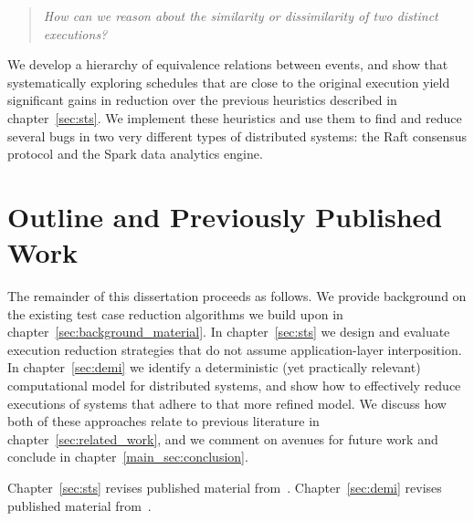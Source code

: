\begin{quote}
\textit{How can we reason about the similarity or dissimilarity of two distinct executions?}
\end{quote}

We develop a hierarchy of equivalence relations between events, and show
that systematically exploring schedules that are close to the original
execution yield significant gains in reduction over the previous
heuristics described in chapter~\ref{sec:sts}. We implement these heuristics
and use them to find and reduce several bugs in two very different types of distributed
systems: the Raft consensus protocol
and the Spark data analytics engine.

\section{Outline and Previously Published Work}

The remainder of this dissertation proceeds as follows. We provide background
on the existing test case reduction algorithms we build upon in
chapter~\ref{sec:background_material}. In chapter~\ref{sec:sts} we design and
evaluate execution reduction strategies that do not assume application-layer
interposition. In chapter~\ref{sec:demi} we identify a deterministic (yet
practically relevant)
computational model for distributed systems, and show how to effectively
reduce executions of systems that adhere to that more refined model. We discuss how both of
these approaches relate to previous literature in
chapter~\ref{sec:related_work}, and we comment on avenues for
future work and conclude in chapter~\ref{main_sec:conclusion}.

Chapter~\ref{sec:sts} revises published material from~\cite{sts2014}.
Chapter~\ref{sec:demi} revises published material from~\cite{Scott:2015:DEMi}.


